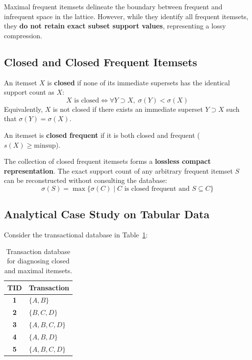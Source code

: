 Maximal frequent itemsets delineate the boundary between frequent and infrequent space in the lattice. However, while they identify all frequent itemsets, they \textbf{do not retain exact subset support values}, representing a lossy compression.

\subsection{Closed and Closed Frequent Itemsets}

\begin{definition}
An itemset $X$ is \textbf{closed} if none of its immediate supersets has the identical support count as $X$:
\begin{equation}
\label{eq:dm-closed-itemset-def-en}
X \text{ is closed} \Longleftrightarrow \forall Y \supset X, \; \sigma(Y) < \sigma(X)
\end{equation}
Equivalently, $X$ is not closed if there exists an immediate superset $Y \supset X$ such that $\sigma(Y) = \sigma(X)$.
\end{definition}

\begin{definition}
An itemset is \textbf{closed frequent} if it is both closed and frequent ($s(X) \ge \mathrm{minsup}$).
\end{definition}

\begin{theorem}
The collection of closed frequent itemsets forms a \textbf{lossless compact representation}. The exact support count of any arbitrary frequent itemset $S$ can be reconstructed without consulting the database:
\begin{equation}
\label{eq:dm-support-reconstruction-closed-en}
\sigma(S) = \max \big\{ \sigma(C) \mid C \text{ is closed frequent and } S \subseteq C \big\}
\end{equation}
\end{theorem}

\subsection{Analytical Case Study on Tabular Data}
Consider the transactional database in Table~\ref{tab:dm-closed-maximal-example-en}:

\begin{table}[htbp]
\centering
\small
\renewcommand{\arraystretch}{1.2}
\begin{tabular}{c l}
\toprule
\textbf{TID} & \textbf{Transaction} \\
\midrule
\textbf{1} & $\{A, B\}$ \\
\textbf{2} & $\{B, C, D\}$ \\
\textbf{3} & $\{A, B, C, D\}$ \\
\textbf{4} & $\{A, B, D\}$ \\
\textbf{5} & $\{A, B, C, D\}$ \\
\bottomrule
\end{tabular}
\caption{Transaction database for diagnosing closed and maximal itemsets.}
\label{tab:dm-closed-maximal-example-en}
\end{table}

